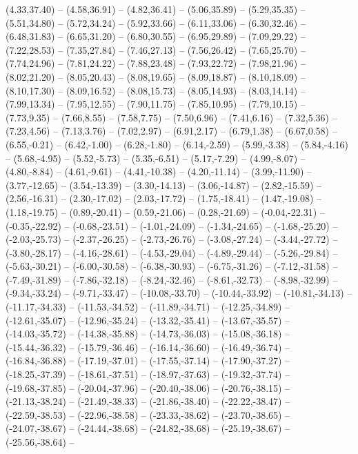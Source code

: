 {  (4.33,37.40) -- (4.58,36.91) -- (4.82,36.41) -- (5.06,35.89) -- (5.29,35.35) -- (5.51,34.80) -- (5.72,34.24) --
  (5.92,33.66) -- (6.11,33.06) -- (6.30,32.46) -- (6.48,31.83) -- (6.65,31.20) -- (6.80,30.55) -- (6.95,29.89) --
  (7.09,29.22) -- (7.22,28.53) -- (7.35,27.84) -- (7.46,27.13) -- (7.56,26.42) -- (7.65,25.70) -- (7.74,24.96) --
  (7.81,24.22) -- (7.88,23.48) -- (7.93,22.72) -- (7.98,21.96) -- (8.02,21.20) -- (8.05,20.43) -- (8.08,19.65) --
  (8.09,18.87) -- (8.10,18.09) -- (8.10,17.30) -- (8.09,16.52) -- (8.08,15.73) -- (8.05,14.93) -- (8.03,14.14) --
  (7.99,13.34) -- (7.95,12.55) -- (7.90,11.75) -- (7.85,10.95) -- (7.79,10.15) -- (7.73,9.35) -- (7.66,8.55) --
  (7.58,7.75) -- (7.50,6.96) -- (7.41,6.16) -- (7.32,5.36) -- (7.23,4.56) -- (7.13,3.76) -- (7.02,2.97) --
  (6.91,2.17) -- (6.79,1.38) -- (6.67,0.58) -- (6.55,-0.21) -- (6.42,-1.00) -- (6.28,-1.80) -- (6.14,-2.59) --
  (5.99,-3.38) -- (5.84,-4.16) -- (5.68,-4.95) -- (5.52,-5.73) -- (5.35,-6.51) -- (5.17,-7.29) -- (4.99,-8.07) --
  (4.80,-8.84) -- (4.61,-9.61) -- (4.41,-10.38) -- (4.20,-11.14) -- (3.99,-11.90) -- (3.77,-12.65) -- (3.54,-13.39) --
  (3.30,-14.13) -- (3.06,-14.87) -- (2.82,-15.59) -- (2.56,-16.31) -- (2.30,-17.02) -- (2.03,-17.72) -- (1.75,-18.41) --
  (1.47,-19.08) -- (1.18,-19.75) -- (0.89,-20.41) -- (0.59,-21.06) -- (0.28,-21.69) -- (-0.04,-22.31) -- (-0.35,-22.92) --
  (-0.68,-23.51) -- (-1.01,-24.09) -- (-1.34,-24.65) -- (-1.68,-25.20) -- (-2.03,-25.73) -- (-2.37,-26.25) -- (-2.73,-26.76) --
  (-3.08,-27.24) -- (-3.44,-27.72) -- (-3.80,-28.17) -- (-4.16,-28.61) -- (-4.53,-29.04) -- (-4.89,-29.44) -- (-5.26,-29.84) --
  (-5.63,-30.21) -- (-6.00,-30.58) -- (-6.38,-30.93) -- (-6.75,-31.26) -- (-7.12,-31.58) -- (-7.49,-31.89) -- (-7.86,-32.18) --
  (-8.24,-32.46) -- (-8.61,-32.73) -- (-8.98,-32.99) -- (-9.34,-33.24) -- (-9.71,-33.47) -- (-10.08,-33.70) -- (-10.44,-33.92) --
  (-10.81,-34.13) -- (-11.17,-34.33) -- (-11.53,-34.52) -- (-11.89,-34.71) -- (-12.25,-34.89) -- (-12.61,-35.07) -- (-12.96,-35.24) --
  (-13.32,-35.41) -- (-13.67,-35.57) -- (-14.03,-35.72) -- (-14.38,-35.88) -- (-14.73,-36.03) -- (-15.08,-36.18) -- (-15.44,-36.32) --
  (-15.79,-36.46) -- (-16.14,-36.60) -- (-16.49,-36.74) -- (-16.84,-36.88) -- (-17.19,-37.01) -- (-17.55,-37.14) -- (-17.90,-37.27) --
  (-18.25,-37.39) -- (-18.61,-37.51) -- (-18.97,-37.63) -- (-19.32,-37.74) -- (-19.68,-37.85) -- (-20.04,-37.96) -- (-20.40,-38.06) --
  (-20.76,-38.15) -- (-21.13,-38.24) -- (-21.49,-38.33) -- (-21.86,-38.40) -- (-22.22,-38.47) -- (-22.59,-38.53) -- (-22.96,-38.58) --
  (-23.33,-38.62) -- (-23.70,-38.65) -- (-24.07,-38.67) -- (-24.44,-38.68) -- (-24.82,-38.68) -- (-25.19,-38.67) -- (-25.56,-38.64) --
}
